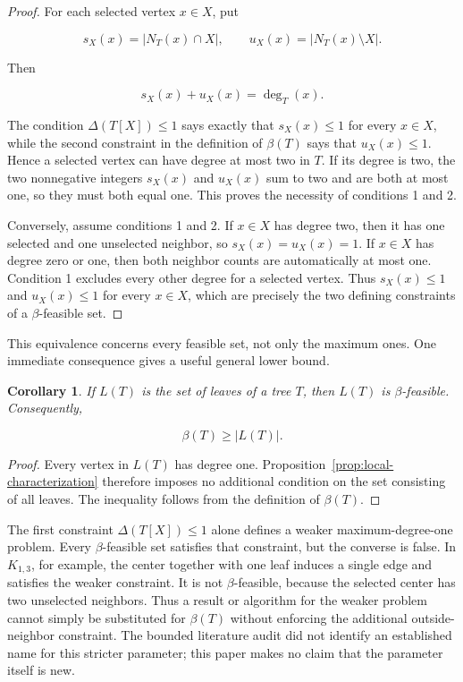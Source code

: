\documentclass[11pt,a4paper]{article}
\newtheorem{corollary}[theorem]{Corollary}
\numberwithin{equation}{section}
\begin{document}
\begin{proof}
For each selected vertex \(x\in X\), put

\[
s_X(x)=|N_T(x)\cap X|,
\qquad
u_X(x)=|N_T(x)\setminus X|.
\]

Then

\[
s_X(x)+u_X(x)=\deg_T(x).
\]

The condition \(\Delta(T[X])\le 1\) says exactly that \(s_X(x)\le 1\)
for every \(x\in X\), while the second constraint in the definition of
\(\beta(T)\) says that \(u_X(x)\le 1\). Hence a selected vertex can have
degree at most two in \(T\). If its degree is two, the two nonnegative
integers \(s_X(x)\) and \(u_X(x)\) sum to two and are both at most one,
so they must both equal one. This proves the necessity of conditions 1
and 2.

Conversely, assume conditions 1 and 2. If \(x\in X\) has degree two,
then it has one selected and one unselected neighbor, so
\(s_X(x)=u_X(x)=1\). If \(x\in X\) has degree zero or one, then both
neighbor counts are automatically at most one. Condition 1 excludes
every other degree for a selected vertex. Thus \(s_X(x)\le 1\) and
\(u_X(x)\le 1\) for every \(x\in X\), which are precisely the two
defining constraints of a \(\beta\)-feasible set.
\end{proof}

This equivalence concerns every feasible set, not only the maximum ones.
One immediate consequence gives a useful general lower bound.

\begin{corollary}\label{cor:leaves}
If \(L(T)\) is the set of leaves of a tree
\(T\), then \(L(T)\) is \(\beta\)-feasible. Consequently,

\[
\beta(T)\ge |L(T)|.
\]
\end{corollary}

\begin{proof}
Every vertex in \(L(T)\) has degree one. Proposition~\ref{prop:local-characterization}
therefore imposes no additional condition on the set consisting of all
leaves. The inequality follows from the definition of \(\beta(T)\).
\end{proof}

The first constraint \(\Delta(T[X])\le 1\) alone defines a weaker
maximum-degree-one problem. Every \(\beta\)-feasible set satisfies that
constraint, but the converse is false. In \(K_{1,3}\), for example, the
center together with one leaf induces a single edge and satisfies the
weaker constraint. It is not \(\beta\)-feasible, because the selected
center has two unselected neighbors. Thus a result or algorithm for the
weaker problem cannot simply be substituted for \(\beta(T)\) without
enforcing the additional outside-neighbor constraint. The
bounded literature audit did not identify an established name for this
stricter parameter; this paper makes no claim that the parameter itself
is new.
\end{document}
